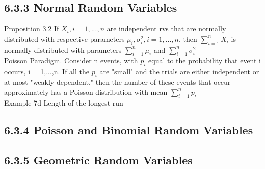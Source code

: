 \documentclass{article}
\begin{document}
\subsection*{6.3.3 Normal Random Variables}
Proposition 3.2 If $X_i, i = 1, ..., n$ are independent rvs that are normally distributed with respective parameters $\mu_i, \sigma_i^2, i = 1, ..., n$, then $\sum_{i=1}^n X_i$ is normally distributed with parameters $\sum_{i=1}^n \mu_i$ and $\sum_{i=1}^n \sigma_i^2$
\\
Poisson Paradigm. Consider n events, with $p_i$ equal to the probability that event i occurs, i = 1,...,n. If all the $p_i$ are "small" and the trials are either independent or at most "weakly dependent," then the number of these events that occur approximately has a Poisson distribution with mean $\sum_{i=1}^n p_i$\\
Example 7d Length of the longest run \\

\subsection*{6.3.4 Poisson and Binomial Random Variables}


\subsection*{6.3.5 Geometric Random Variables}


\end{document}
